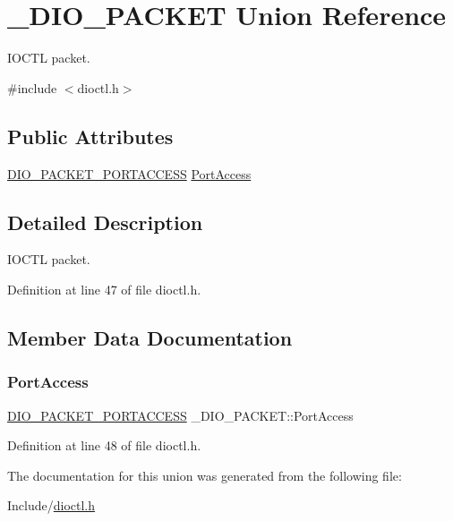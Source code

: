\hypertarget{union___d_i_o___p_a_c_k_e_t}{}\section{\+\_\+\+D\+I\+O\+\_\+\+P\+A\+C\+K\+ET Union Reference}
\label{union___d_i_o___p_a_c_k_e_t}


I\+O\+C\+TL packet.  




{\ttfamily \#include $<$dioctl.\+h$>$}

\subsection*{Public Attributes}
\begin{DoxyCompactItemize}
\item 
\mbox{\hyperlink{dioctl_8h_afd6ae870a31bc0c3a9c04d33bd705dac}{D\+I\+O\+\_\+\+P\+A\+C\+K\+E\+T\+\_\+\+P\+O\+R\+T\+A\+C\+C\+E\+SS}} \mbox{\hyperlink{union___d_i_o___p_a_c_k_e_t_af8a9e528f2db69ad0997fd7a5e727dfb}{Port\+Access}}
\end{DoxyCompactItemize}


\subsection{Detailed Description}
I\+O\+C\+TL packet. 

Definition at line 47 of file dioctl.\+h.



\subsection{Member Data Documentation}
\mbox{\label{union___d_i_o___p_a_c_k_e_t_af8a9e528f2db69ad0997fd7a5e727dfb}} 
\subsubsection{\texorpdfstring{PortAccess}{PortAccess}}
{\footnotesize\ttfamily \mbox{\hyperlink{dioctl_8h_afd6ae870a31bc0c3a9c04d33bd705dac}{D\+I\+O\+\_\+\+P\+A\+C\+K\+E\+T\+\_\+\+P\+O\+R\+T\+A\+C\+C\+E\+SS}} \+\_\+\+D\+I\+O\+\_\+\+P\+A\+C\+K\+E\+T\+::\+Port\+Access}



Definition at line 48 of file dioctl.\+h.



The documentation for this union was generated from the following file\+:\begin{DoxyCompactItemize}
\item 
Include/\mbox{\hyperlink{dioctl_8h}{dioctl.\+h}}\end{DoxyCompactItemize}
